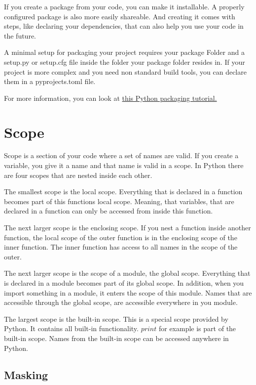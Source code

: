 \documentclass{article}
\begin{document}
If you create a package from your code, you can make it installable.
A properly configured package is also more easily shareable.
And creating it comes with steps, like declaring your dependencies, that
can also help you use your code in the future.

A minimal setup for packaging your project requires your package Folder and
a setup.py or setup.cfg file inside the folder your package folder resides in.
If your project is more complex and you need non standard build tools,
you can declare them in a pyprojects.toml file.

For more information, you can look at
\href{https://packaging.python.org/tutorials/packaging-projects/}{this Python packaging tutorial.}

\section{Scope}

Scope is a section of your code where a set of names are valid.
If you create a variable, you give it a name and that name is valid in a scope.
In Python there are four scopes that are nested inside each other.

The smallest scope is the local scope.
Everything that is declared in a function becomes part of this functions local scope.
Meaning, that variables, that are declared in a function can only be accessed
from inside this function.

The next larger scope is the enclosing scope.
If you nest a function inside another function, the local scope of the outer function
is in the enclosing scope of the inner function.
The inner function has access to all names in the scope of the outer.

The next larger scope is the scope of a module, the global scope.
Everything that is declared in a module becomes part of its global scope.
In addition, when you import something in a module, it enters the scope of this module.
Names that are accessible through the global scope, are accessible everywhere in
you module.

The largest scope is the built-in scope.
This is a special scope provided by Python.
It contains all built-in functionality.
$print$ for example is part of the built-in scope.
Names from the built-in scope can be accessed anywhere in Python.

\subsection{Masking}
\end{document}
